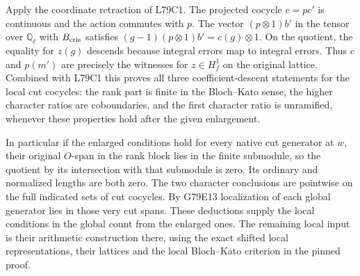 Apply the coordinate retraction of L79C1. The projected cocycle
$c=p c'$ is continuous and the action commutes with $p$. The vector
$(p\otimes1)b'$ in the tensor over $\mathbb Q_\ell$ with
$B_{\rm cris}$ satisfies $(g-1)(p\otimes1)b'=c(g)\otimes1$.
On the quotient, the equality for $z(g)$ descends because integral
errors map to integral errors. Thus $c$ and $p(m')$ are precisely
the witnesses for $z\in H^1_f$ on the original lattice.
Combined with L79C1 this proves all three coefficient-descent
statements for the local cut cocycles: the rank part is finite
in the Bloch--Kato sense, the higher character ratios are
coboundaries, and the first character ratio is unramified, whenever
these properties hold after the given enlargement.

In particular if the enlarged conditions hold for every native cut
generator at $w$, their original $O$-span in the rank block lies in
the finite submodule, so the quotient by its intersection with that
submodule is zero. Its ordinary and normalized lengths are both zero.
The two character conclusions are pointwise on the full indicated
sets of cut cocycles. By G79E13 localization of each global generator
lies in those very cut spans. These deductions supply the local
conditions in the global count from the enlarged ones. The remaining
local input is their arithmetic construction there, using the exact
shifted local representations, their lattices and the local
Bloch--Kato criterion in the pinned proof.
